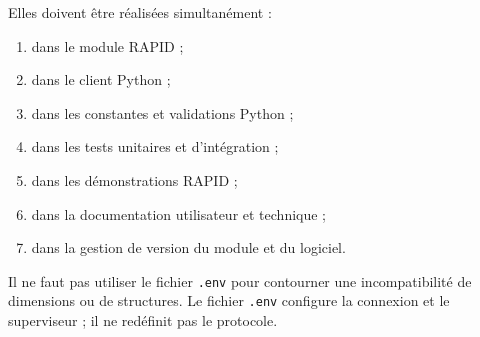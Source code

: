 \documentclass{rapportENSAM}
\begin{document}
Elles doivent être réalisées simultanément :

\begin{enumerate}
    \item dans le module RAPID ;
    \item dans le client Python ;
    \item dans les constantes et validations Python ;
    \item dans les tests unitaires et d'intégration ;
    \item dans les démonstrations RAPID ;
    \item dans la documentation utilisateur et technique ;
    \item dans la gestion de version du module et du logiciel.
\end{enumerate}

Il ne faut pas utiliser le fichier \texttt{.env} pour contourner une
incompatibilité de dimensions ou de structures. Le fichier
\texttt{.env} configure la connexion et le superviseur ; il ne redéfinit pas
le protocole.

\FloatBarrier
\end{document}
